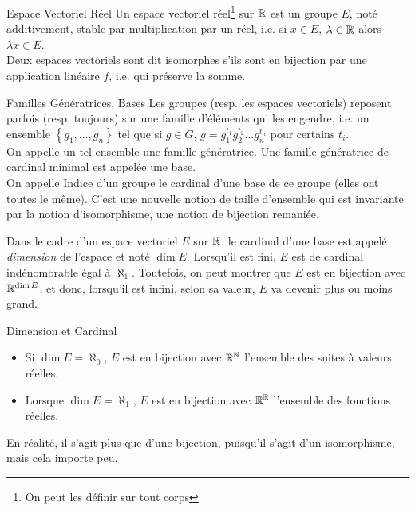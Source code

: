 \documentclass{cours}
\begin{document}
    \begin{définition}{Espace Vectoriel Réel}{}
        Un espace vectoriel réel\footnote{On peut les définir sur tout corps} sur $\mathbb{R}$ est un groupe $E$, noté additivement, stable par multiplication par un réel, i.e. si $x \in E$, $\lambda \in \mathbb{R}$ alors $\lambda x \in E$. \\
        Deux espaces vectoriels sont dit isomorphes s'ils sont en bijection par une application linéaire $f$, i.e. qui préserve la somme.
    \end{définition}

    \begin{définition}{Familles Génératrices, Bases}{}
        Les groupes (resp. les espaces vectoriels) reposent parfois (resp. toujours) sur une famille d'éléments qui les engendre, i.e. un ensemble $\left\{g_{1},\ldots, g_{n}\right\}$ tel que si $g \in G$, $g = g_{1}^{t_{1}}g_{2}^{t_{2}}\ldots g_{n}^{t_{n}}$ pour certains $t_{i}$.\\
        On appelle un tel ensemble une famille génératrice. Une famille génératrice de cardinal minimal est appelée une base. \\
        On appelle Indice d'un groupe le cardinal d'une base de ce groupe (elles ont toutes le même). C'est une nouvelle notion de taille d'ensemble qui est invariante par la notion d'isomorphisme, une notion de bijection remaniée.
    \end{définition}
    
    Dans le cadre d'un espace vectoriel $E$ sur $\mathbb{R}$, le cardinal d'une base est appelé \emph{dimension} de l'espace et noté $\dim E$. Lorsqu'il est fini, $E$ est de cardinal indénombrable égal à $\aleph_{1}$. Toutefois, on peut montrer que $E$ est en bijection avec $\mathbb{R}^{\dim E}$, et donc, lorsqu'il est infini, selon sa valeur, $E$ va devenir plus ou moins grand.\\
    \begin{propositionfr}{Dimension et Cardinal}{}
        \begin{itemize}
            \item Si $\dim E = \aleph_{0}$, $E$ est en bijection avec $\mathbb{R}^{\mathbb{N}}$ l'ensemble des suites à valeurs réelles.
            \item Lorsque $\dim E = \aleph_{1}$, $E$ est en bijection avec $\mathbb{R}^{\mathbb{R}}$ l'ensemble des fonctions réelles.
        \end{itemize}
    \end{propositionfr}

    \begin{remarque}{}{}
        En réalité, il s'agit plus que d'une bijection, puisqu'il s'agit d'un isomorphisme, mais cela importe peu. 
    \end{remarque}
\end{document}
